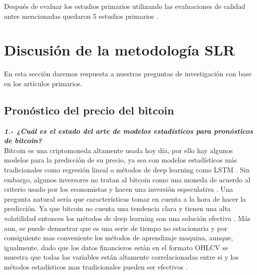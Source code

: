 Después de evaluar los estudios primarios utilizando las evaluaciones de calidad antes mencionadas quedaron 5 estudios primarios \parencite{ibrahimPredictingMarketMovement2021,jaquartShorttermBitcoinMarket2021,chenBitcoinPricePrediction2020,akyildirimPredictionCryptocurrencyReturns2021,pintelasInvestigatingProblemCryptocurrency2020}.

\section{Discusión de la metodología SLR}
En esta sección daremos respuesta a nuestras preguntas de investigación con base en los artículos primarios.

\subsection{Pronóstico del precio del bitcoin}

\textbf{\textit{1.- ¿Cuál es el estado del arte de modelos estadísticos para pronósticos de bitcoin?}}\\
Bitcoin es una criptomoneda altamente usada hoy día, por ello hay algunos modelos para la predicción de su precio, ya sea con modelos estadísticos más tradicionales como regresión lineal o métodos de deep learning como LSTM \parencite{tandonBitcoinPriceForecasting2019}. Sin embargo, algunos inversores no tratan al bitcoin como una moneda de acuerdo al criterio usado por los economistas y hacen una inversión especulativa \parencite{chenBitcoinPricePrediction2020}. Una pregunta natural sería que características tomar en cuenta a la hora de hacer la predicción. Ya que bitcoin no cuenta una tendencia clara y tienen una alta volatilidad entonces los métodos de deep learning son una solución efectiva \parencite{tandonBitcoinPriceForecasting2019}. Más aun, se puede demostrar que es una serie de tiempo no estacionaria \parencite{mudassirTimeseriesForecastingBitcoin2020} y por consiguiente mas conveniente los métodos de aprendizaje maquina, aunque, igualmente, dado que los datos financieros están en el formato OHLCV se muestra que todas las variables están altamente correlacionadas entre si y los métodos estadísticos mas tradicionales pueden ser efectivos \parencite{phaladisailoedMachineLearningModels2018}.\\

